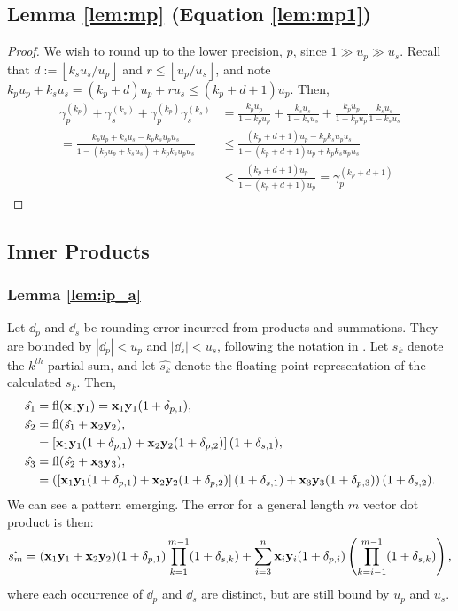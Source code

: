 \subsection{Lemma \ref{lem:mp} (Equation \ref{lem:mp1})}
\begin{proof}
	We wish to round up to the lower precision, $p$, since $1\gg u_p \gg u_s$.  
	Recall that $d := \left\lfloor k_s u_s  / u_p \right\rfloor$ and $r \leq \left\lfloor u_p  / u_s \right\rfloor$,
	and note
	$ k_pu_p+k_su_s = (k_p+d)u_p + r u_s \leq (k_p+d+1)u_p$. Then,
	\begin{align*}
	\gamma_{p}^{(k_p)}+\gamma_{s}^{(k_s)}+\gamma_{p}^{(k_p)}\gamma_{s}^{(k_s)} 
&= \frac{k_pu_p}{1-k_pu_p} + \frac{k_su_s}{1-k_su_s} + \frac{k_pu_p}{1-k_pu_p}\frac{k_su_s}{1-k_su_s} \\
	= \frac{k_pu_p+k_su_s-k_pk_su_pu_s}{1-(k_pu_p+k_su_s)+k_pk_su_pu_s} %
	&\leq \frac{(k_p+d+1)u_p-k_pk_su_pu_s}{1-(k_p+d+1)u_p+k_pk_su_pu_s} \\
	&< \frac{(k_p+d+1)u_p}{1-(k_p+d+1)u_p} = \gamma_{p}^{(k_p+d+1)}
	\end{align*}
\end{proof}

\subsection{Inner Products}
\label{appendix:IP}
\subsubsection{Lemma \ref{lem:ip_a}}
Let $\dd_p$ and $\dd_s$ be rounding error incurred from products and summations.
They are bounded by $|\dd_p| < u_p$ and $|\dd_s| < u_s$, following the notation in \cite{Higham2002}. Let $s_k$ denote the $k^{th}$ partial sum, and let $\hat{s_k}$ denote the floating point representation of the calculated $s_k$.
Then,
\begin{align*}
	\hat{s_1} &= \mathrm{fl} (\mathbf{x}_1\mathbf{y}_1) = \mathbf{x}_1\mathbf{y}_1(1 + \delta_{p,1}),\\
	\hat{s_2} &= \mathrm{fl}(\hat{s_1} + \mathbf{x}_2\mathbf{y}_2), \\
	&= \left[\mathbf{x}_1\mathbf{y}_1(1 + \delta_{p,1}) + \mathbf{x}_2\mathbf{y}_2(1 + \delta_{p,2})\right](1+\delta_{s,1}),\\
	\hat{s_3} &= \mathrm{fl}(\hat{s_2}+\mathbf{x}_3\mathbf{y}_3), \\
	&= \left(\left[\mathbf{x}_1\mathbf{y}_1(1 + \delta_{p,1}) + \mathbf{x}_2\mathbf{y}_2(1 + \delta_{p,2})\right](1+\delta_{s,1})  + \mathbf{x}_3\mathbf{y}_3(1+\delta_{p,3})\right)(1+\delta_{s,2}).
\end{align*}
We can see a pattern emerging. 
The error for a general length $m$ vector dot product is then:
\begin{equation}
\label{eqn:dperr_1}
\hat{s_m} = (\mathbf{x}_1\mathbf{y}_1+\mathbf{x}_2\mathbf{y}_2)(1+ \delta_{p,1})\prod_{k=1}^{m-1}(1+\delta_{s,k}) + \sum_{i=3}^n \mathbf{x}_i\mathbf{y}_i(1+\delta_{p,i})\left(\prod_{k=i-1}^{m-1}(1+\delta_{s,k})\right),
\end{equation}
where each occurrence of $\dd_p$ and $\dd_s$ are distinct, but are still bound by $u_p$ and $u_s$.

